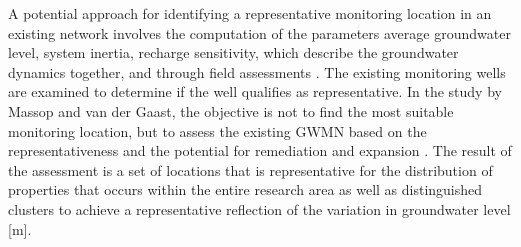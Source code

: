 A potential approach for identifying a representative monitoring location in an existing network involves the computation of the parameters average groundwater level, system inertia, recharge sensitivity, which describe the groundwater dynamics together, and through field assessments \cite{massop-2003}. The existing monitoring wells are examined to determine if the well qualifies as representative. In the study by Massop and van der Gaast, the objective is not to find the most suitable monitoring location, but to assess the existing GWMN based on the representativeness and the potential for remediation and expansion \cite{massop-2003}. The result of the assessment is a set of locations that is representative for the distribution of properties that occurs within the entire research area as well as distinguished clusters to achieve a representative reflection of the variation in groundwater level [m].

